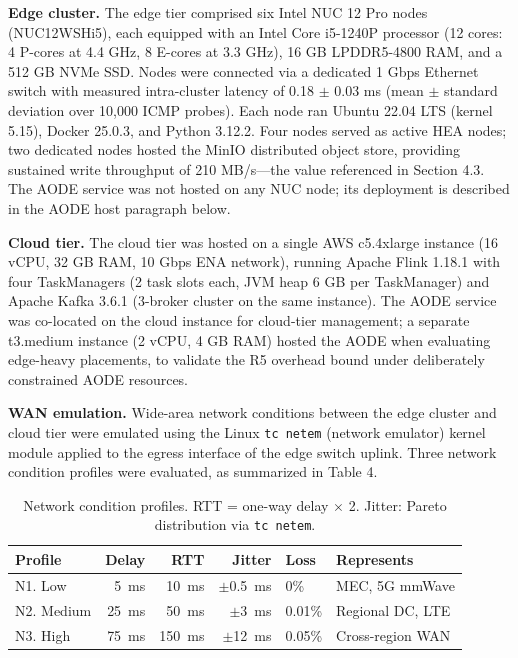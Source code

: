 \documentclass[preprint,review,12pt]{elsarticle}
\begin{document}
\textbf{Edge cluster.} The edge tier comprised six Intel NUC 12 Pro nodes (NUC12WSHi5), each equipped with an Intel Core i5-1240P processor (12 cores: 4 P-cores at 4.4 GHz, 8 E-cores at 3.3 GHz), 16 GB LPDDR5-4800 RAM, and a 512 GB NVMe SSD. Nodes were connected via a dedicated 1 Gbps Ethernet switch with measured intra-cluster latency of 0.18 $\pm$ 0.03 ms (mean $\pm$ standard deviation over 10,000 ICMP probes). Each node ran Ubuntu 22.04 LTS (kernel 5.15), Docker 25.0.3, and Python 3.12.2. Four nodes served as active HEA nodes; two dedicated nodes hosted the MinIO distributed object store, providing sustained write throughput of 210 MB/s—the value referenced in Section 4.3. The AODE service was not hosted on any NUC node; its deployment is described in the AODE host paragraph below.

\textbf{Cloud tier.} The cloud tier was hosted on a single AWS c5.4xlarge instance (16 vCPU, 32 GB RAM, 10 Gbps ENA network), running Apache Flink 1.18.1 with four TaskManagers (2 task slots each, JVM heap 6 GB per TaskManager) and Apache Kafka 3.6.1 (3-broker cluster on the same instance). The AODE service was co-located on the cloud instance for cloud-tier management; a separate t3.medium instance (2 vCPU, 4 GB RAM) hosted the AODE when evaluating edge-heavy placements, to validate the R5 overhead bound under deliberately constrained AODE resources.

\textbf{WAN emulation.} Wide-area network conditions between the edge cluster and cloud tier were emulated using the Linux \texttt{tc\ netem} (network emulator) kernel module applied to the egress interface of the edge switch uplink. Three network condition profiles were evaluated, as summarized in Table 4.


\begin{table}[htbp]
\centering
\caption{Network condition profiles. RTT = one-way delay $\times$ 2. Jitter: Pareto distribution via \texttt{tc netem}.}
\label{tab:network}
\begin{tabular}{@{}lrrrll@{}}
\toprule
Profile & Delay & RTT & Jitter & Loss & Represents \\
\midrule
N1. Low & 5~ms & 10~ms & $\pm$0.5~ms & 0\% & MEC, 5G mmWave \\
N2. Medium & 25~ms & 50~ms & $\pm$3~ms & 0.01\% & Regional DC, LTE \\
N3. High & 75~ms & 150~ms & $\pm$12~ms & 0.05\% & Cross-region WAN \\
\bottomrule
\end{tabular}
\end{table}
\end{document}
